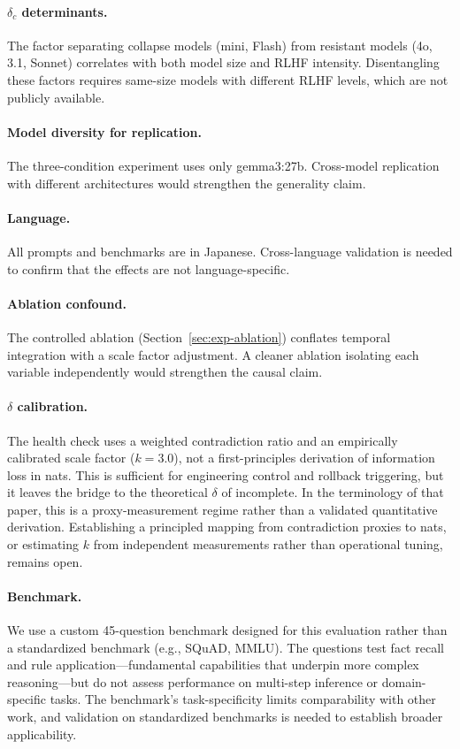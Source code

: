 \documentclass[11pt,a4paper]{article}
\begin{document}
\paragraph{$\delta_c$ determinants.}
The factor separating collapse models (mini, Flash) from resistant models (4o, 3.1, Sonnet) correlates with both model size and RLHF intensity. Disentangling these factors requires same-size models with different RLHF levels, which are not publicly available.

\paragraph{Model diversity for replication.}
The three-condition experiment uses only gemma3:27b.
Cross-model replication with different architectures would strengthen the generality claim.

\paragraph{Language.}
All prompts and benchmarks are in Japanese.
Cross-language validation is needed to confirm that the effects are not language-specific.

\paragraph{Ablation confound.}
The controlled ablation (Section~\ref{sec:exp-ablation}) conflates temporal integration with a scale factor adjustment.
A cleaner ablation isolating each variable independently would strengthen the causal claim.

\paragraph{$\delta$ calibration.}
The health check uses a weighted contradiction ratio and an empirically calibrated scale factor ($k = 3.0$), not a first-principles derivation of information loss in nats.
This is sufficient for engineering control and rollback triggering, but it leaves the bridge to the theoretical $\delta$ of \citet{sunagawa2026collapse} incomplete.
In the terminology of that paper, this is a proxy-measurement regime rather than a validated quantitative derivation.
Establishing a principled mapping from contradiction proxies to nats, or estimating $k$ from independent measurements rather than operational tuning, remains open.

\paragraph{Benchmark.}
We use a custom 45-question benchmark designed for this evaluation rather than a standardized benchmark (e.g., SQuAD, MMLU).
The questions test fact recall and rule application---fundamental capabilities that underpin more complex reasoning---but do not assess performance on multi-step inference or domain-specific tasks.
The benchmark's task-specificity limits comparability with other work, and validation on standardized benchmarks is needed to establish broader applicability.
\end{document}
